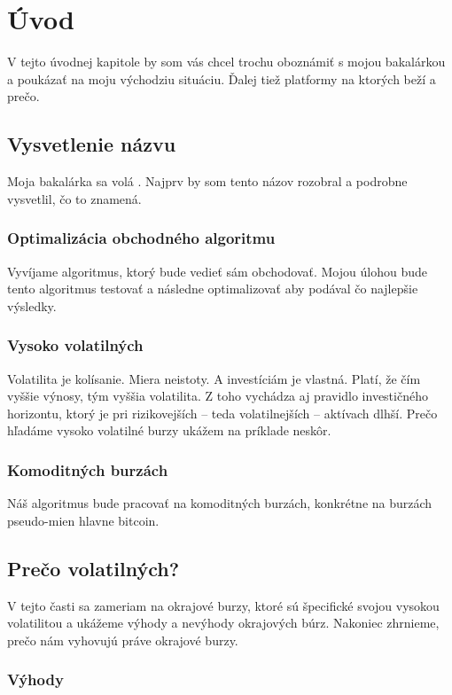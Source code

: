 \chapter{Úvod}\label{chap:intro} 

V tejto úvodnej kapitole by som vás chcel trochu oboznámiť s mojou bakalárkou a poukázať na moju východziu situáciu. Ďalej tiež platformy na ktorých beží a prečo. 
\section{Vysvetlenie názvu} 
Moja bakalárka sa volá . Najprv by som tento názov rozobral a podrobne vysvetlil, čo to znamená. 
\subsection{Optimalizácia obchodného algoritmu} 
Vyvíjame algoritmus, ktorý bude vedieť sám obchodovať. Mojou úlohou bude tento algoritmus testovať a následne optimalizovať aby podával čo najlepšie výsledky. 
\subsection{Vysoko volatilných} 
Volatilita\cite{Volatilita} je kolísanie. Miera neistoty. A investíciám je vlastná. Platí, že čím vyššie výnosy, tým vyššia volatilita. Z toho vychádza aj pravidlo investičného horizontu, ktorý je pri rizikovejších – teda volatilnejších – aktívach dlhší. Prečo hľadáme  vysoko volatilné burzy ukážem na príklade neskôr. 
\subsection{Komoditných burzách} 
Náš algoritmus bude pracovať na komoditných burzách, konkrétne na burzách pseudo-mien  hlavne bitcoin. 

\section{Prečo volatilných?} 
V tejto časti sa zameriam na okrajové burzy, ktoré sú špecifické svojou vysokou volatilitou 
a ukážeme výhody a nevýhody okrajových búrz. Nakoniec zhrnieme, prečo nám vyhovujú práve okrajové burzy. 
\subsection{Výhody} 
